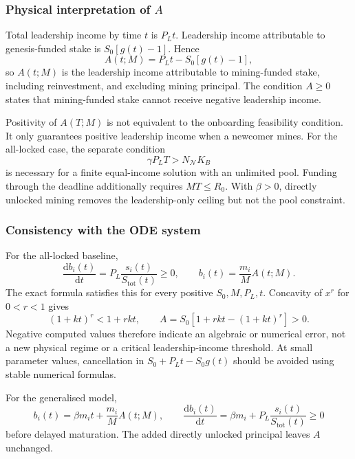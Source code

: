 \documentclass[11pt,a4paper]{article}
\newcommand{\rmd}{\mathrm{d}}
\begin{document}
\subsubsection{Physical interpretation of $A$}
Total leadership income by time $t$ is $P_Lt$. Leadership income attributable to genesis-funded stake is $S_0[g(t)-1]$. Hence
\begin{equation}
A(t;M)=P_Lt-S_0[g(t)-1],
\end{equation}
so $A(t;M)$ is the leadership income attributable to mining-funded stake, including reinvestment, and excluding mining principal. The condition $A\ge0$ states that mining-funded stake cannot receive negative leadership income.

Positivity of $A(T;M)$ is not equivalent to the onboarding feasibility condition. It only guarantees positive leadership income when a newcomer mines. For the all-locked case, the separate condition
\begin{equation}
\gamma P_LT>N_{\mathcal N}K_B
\end{equation}
is necessary for a finite equal-income solution with an unlimited pool. Funding through the deadline additionally requires $MT\le R_0$. With $\beta>0$, directly unlocked mining removes the leadership-only ceiling but not the pool constraint.

\subsubsection{Consistency with the ODE system}
For the all-locked baseline,
\begin{equation}
\frac{\rmd b_i(t)}{\rmd t}=P_L\frac{s_i(t)}{S_{\mathrm{tot}}(t)}\ge0,
\qquad b_i(t)=\frac{m_i}{M}A(t;M).
\end{equation}
The exact formula satisfies this for every positive $S_0,M,P_L,t$. Concavity of $x^r$ for $0<r<1$ gives
\begin{equation}
(1+kt)^r<1+rkt,\qquad
A=S_0[1+rkt-(1+kt)^r]>0.
\end{equation}
Negative computed values therefore indicate an algebraic or numerical error, not a new physical regime or a critical leadership-income threshold. At small parameter values, cancellation in $S_0+P_Lt-S_0g(t)$ should be avoided using stable numerical formulas.

For the generalised model,
\begin{equation}
b_i(t)=\beta m_it+\frac{m_i}{M}A(t;M),
\qquad
\frac{\rmd b_i(t)}{\rmd t}=\beta m_i+P_L\frac{s_i(t)}{S_{\mathrm{tot}}(t)}\ge0
\end{equation}
before delayed maturation. The added directly unlocked principal leaves $A$ unchanged.
\end{document}
